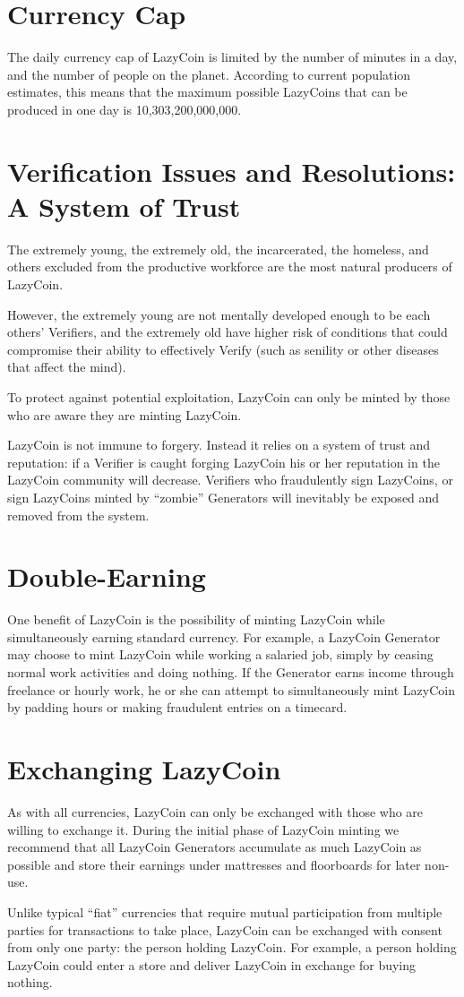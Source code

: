 \documentclass[a4paper]{article}
\begin{document}
\section{Currency Cap}
The daily currency cap of LazyCoin is limited by the number of minutes in a day, and the number of people on the planet. According to current population estimates, this means that the maximum possible LazyCoins that can be produced in one day is 10,303,200,000,000.


\section{Verification Issues and Resolutions: A System of Trust}
The extremely young, the extremely old, the incarcerated, the homeless, and others excluded from the productive workforce are the most natural producers of LazyCoin.

However, the extremely young are not mentally developed enough to be each others’ Verifiers, and the extremely old have higher risk of conditions that could compromise their ability to effectively Verify (such as senility or other diseases that affect the mind). 

To protect against potential exploitation, LazyCoin can only be minted by those who are aware they are minting LazyCoin. 

LazyCoin is not immune to forgery. Instead it relies on a system of trust and reputation: if a Verifier is caught forging LazyCoin his or her reputation in the LazyCoin community will decrease. Verifiers who fraudulently sign LazyCoins, or sign LazyCoins minted by “zombie” Generators will inevitably be exposed and removed from the system.

\section{Double-Earning}
One benefit of LazyCoin is the possibility of minting LazyCoin while simultaneously earning standard currency. For example, a LazyCoin Generator may choose to mint LazyCoin while working a salaried job, simply by ceasing normal work activities and doing nothing. If the Generator earns income through freelance or hourly work, he or she can attempt to simultaneously mint LazyCoin by padding hours or making fraudulent entries on a timecard. 

\section{Exchanging LazyCoin}
As with all currencies, LazyCoin can only be exchanged with those who are willing to exchange it. During the initial phase of LazyCoin minting we recommend that all LazyCoin Generators accumulate as much LazyCoin as possible and store their earnings under mattresses and floorboards for later non-use.

Unlike typical ``fiat'' currencies that require mutual participation from multiple parties for transactions to take place, LazyCoin can be exchanged with consent from only one party: the person holding LazyCoin. For example, a person holding LazyCoin could enter a store and deliver LazyCoin in exchange for buying nothing.
\end{document}
